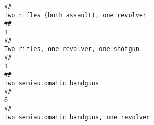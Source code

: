 \documentclass[
]{article}
\begin{document}
\begin{verbatim}
##                                                                                                                                                                                                                                                                                                                                                               Two rifles (both assault), one revolver 
##                                                                                                                                                                                                                                                                                                                                                                                                     1 
##                                                                                                                                                                                                                                                                                                                                                                 Two rifles, one revolver, one shotgun 
##                                                                                                                                                                                                                                                                                                                                                                                                     1 
##                                                                                                                                                                                                                                                                                                                                                                            Two semiautomatic handguns 
##                                                                                                                                                                                                                                                                                                                                                                                                     6 
##                                                                                                                                                                                                                                                                                                                                                              Two semiautomatic handguns, one revolver 

\end{verbatim}
\end{document}
